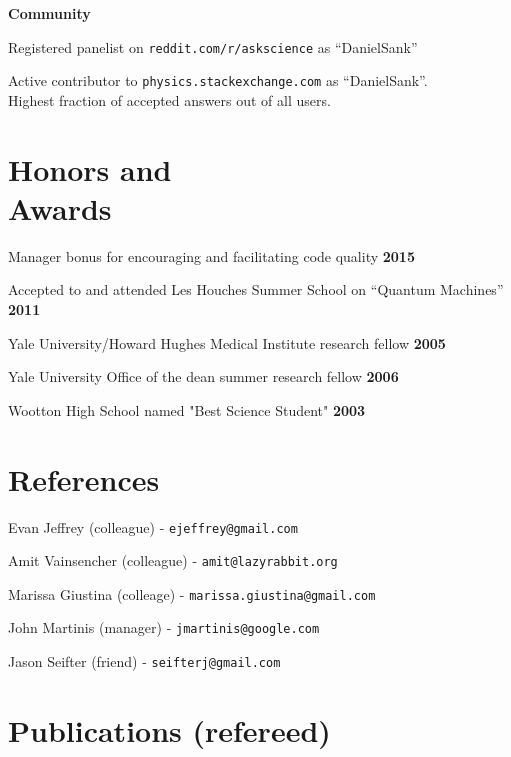 \documentclass[margin=2cm,line]{res}
\begin{document}
\begin{resume}
{\bf Community}
\begin{list4}
\item Registered panelist on \texttt{reddit.com/r/askscience} as ``DanielSank''
\item Active contributor to \texttt{physics.stackexchange.com} as ``DanielSank''.\\
Highest fraction of accepted answers out of all users.
\end{list4}


\section{\sc Honors and\\ Awards}
\begin{list3}
\item Manager bonus for encouraging and facilitating code quality \hfill {\bf 2015}
\item Accepted to and attended Les Houches Summer School on ``Quantum Machines'' \hfill {\bf 2011}
\item Yale University/Howard Hughes Medical Institute research fellow \hfill {\bf 2005}
\item Yale University Office of the dean summer research fellow \hfill {\bf 2006}
\item Wootton High School named "Best Science Student" \hfill {\bf 2003}
\end{list3}

\section{\sc References}
\begin{list3}
\item Evan Jeffrey (colleague) - \texttt{ejeffrey@gmail.com}
\item Amit Vainsencher (colleague) - \texttt{amit@lazyrabbit.org}
\item Marissa Giustina (colleage) - \texttt{marissa.giustina@gmail.com}
\item John Martinis (manager) - \texttt{jmartinis@google.com}
\item Jason Seifter (friend) - \texttt{seifterj@gmail.com}
\end{list3}

\pagebreak


\section{\sc Publications (refereed)}


\end{resume}
\end{document}
